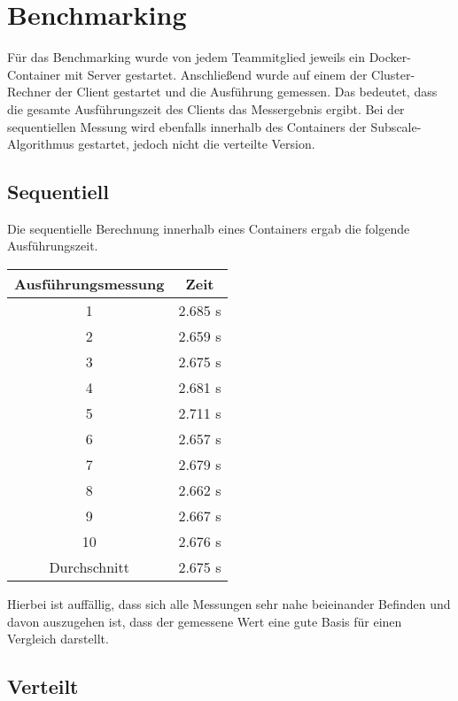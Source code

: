 \section{Benchmarking}
Für das Benchmarking wurde von jedem Teammitglied jeweils ein Docker-Container mit Server gestartet. Anschließend wurde
auf einem der Cluster-Rechner der Client gestartet und die Ausführung gemessen. Das bedeutet, dass die gesamte
Ausführungszeit des Clients das Messergebnis ergibt. Bei der sequentiellen Messung wird ebenfalls innerhalb des
Containers der Subscale-Algorithmus gestartet, jedoch nicht die verteilte Version.

\subsection{Sequentiell}
Die sequentielle Berechnung innerhalb eines Containers ergab die folgende Ausführungszeit.

\begin{center}
    \begin{tabular}{ |c|c| }
        \hline
        Ausführungsmessung & Zeit    \\
        \hline
        1                  & 2.685 s \\
        2                  & 2.659 s \\
        3                  & 2.675 s \\
        4                  & 2.681 s \\
        5                  & 2.711 s \\
        6                  & 2.657 s \\
        7                  & 2.679 s \\
        8                  & 2.662 s \\
        9                  & 2.667 s \\
        10                 & 2.676 s \\
        \hline
        Durchschnitt       & 2.675 s \\
        \hline
    \end{tabular}
\end{center}

Hierbei ist auffällig, dass sich alle Messungen sehr nahe beieinander Befinden und davon auszugehen ist, dass der
gemessene Wert eine gute Basis für einen Vergleich darstellt.

\subsection{Verteilt}

